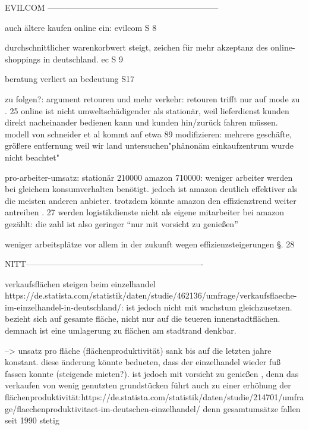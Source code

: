         EVILCOM --------------------------------------------------------------
        
        auch ältere kaufen online ein: evilcom S 8
        
        durchschnittlicher warenkorbwert steigt, zeichen für mehr akzeptanz des online-shoppings in deutschland. ec S 9
        
        beratung verliert an bedeutung S17
        
        zu folgen?:
        argument retouren und mehr verkehr: retouren trifft nur auf mode zu \s. 25
        online ist nicht umweltschädigender als stationär, weil lieferdienst kunden direkt nacheinander bedienen kann und kunden hin/zurück fahren müssen. modell von schneider et al kommt auf etwa 89%
        modifizieren: mehrere geschäfte, größere entfernung weil wir land untersuchen"phänonäm einkaufzentrum wurde nicht beachtet"
        
        pro-arbeiter-umsatz: stationär 210000 amazon 710000: weniger arbeiter werden bei gleichem konsumverhalten benötigt. jedoch ist amazon deutlich effektiver als die meisten anderen anbieter. trotzdem könnte amazon den effizienztrend weiter antreiben \s. 27 werden logistikdienste nicht als eigene mitarbeiter bei amazon gezählt: die zahl ist also geringer ``nur mit vorsicht zu genießen''
        
        weniger arbeitsplätze vor allem in der zukunft wegen effizienzsteigerungen \S. 28
        
        
        NITT----------------------------------------------------------------
        
        verkaufsflächen steigen beim einzelhandel https://de.statista.com/statistik/daten/studie/462136/umfrage/verkaufsflaeche-im-einzelhandel-in-deutschland/: ist jedoch nicht mit wachstum gleichzusetzen. bezieht sich auf gesamte fläche, nicht nur auf die teueren innenstadtflächen. demnach ist eine umlagerung zu flächen am stadtrand denkbar.
        
        --> unsatz pro fläche (flächenproduktivität) sank bis auf die letzten jahre konstant. diese änderung könnte bedueten, dass der einzelhandel wieder fuß fassen konnte (steigende mieten?). ist jedoch mit vorsicht zu genießen , denn das verkaufen von wenig genutzten grundstücken führt auch zu einer erhöhung der flächenproduktivität:https://de.statista.com/statistik/daten/studie/214701/umfrage/flaechenproduktivitaet-im-deutschen-einzelhandel/
        denn gesamtumsätze fallen seit 1990 stetig\cite[S. 6]{Nitt}
        
